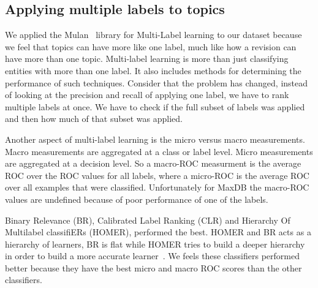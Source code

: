 \documentclass{acm_proc_article-sp}
\begin{document}
\subsection{Applying multiple labels to topics}

We applied the Mulan~\cite{mulan} library for Multi-Label learning to our dataset because we feel that topics can have more like one label, much like how a revision can have more than one topic. Multi-label learning is more than just classifying entities with more than one label. It also includes methods for determining the performance of such techniques. Consider that the problem has changed, instead of looking at the precision and recall of applying one label, we have to rank multiple labels at once. We have to check if the full subset of labels was applied and then how much of that subset was applied.

Another aspect of multi-label learning is the micro versus macro measurements. Macro measurements are aggregated at a class or label level. Micro measurements are aggregated at a decision level. So a macro-ROC measurment is the average ROC over the ROC values for all labels, where a micro-ROC is the average ROC over all examples that were classified. Unfortunately for MaxDB the macro-ROC values are undefined because of poor performance of one of the labels.

 Binary Relevance (BR), Calibrated Label Ranking (CLR) and Hierarchy Of Multilabel classifiERs (HOMER), performed the best. HOMER and BR acts as a hierarchy of learners, BR is flat while HOMER tries to build a deeper hierarchy in order to build a more accurate learner~\cite{mulan}. We feels these classifiers performed better because they have the best micro and macro ROC scores than the other classifiers.
\end{document}
